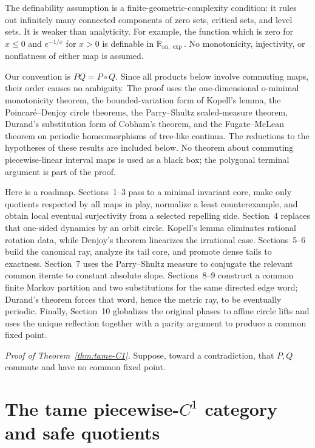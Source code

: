 \documentclass[11pt]{article}
\theoremstyle{definition}
\theoremstyle{remark}
\begin{document}
The definability assumption is a finite-geometric-complexity condition: it
rules out infinitely many connected components of zero sets, critical sets,
and level sets.  It is weaker than analyticity.  For example, the function
which is zero for $x\leq0$ and $e^{-1/x}$ for $x>0$ is definable in
$\mathbb R_{\mathrm{an},\exp}$.  No monotonicity, injectivity, or
nonflatness of either map is assumed.

Our convention is \(PQ=P\circ Q\).  Since all products below involve
commuting maps, their order causes no ambiguity.  The proof uses the
one-dimensional o-minimal monotonicity theorem, the bounded-variation form of
Kopell's lemma, the Poincar\'e--Denjoy circle theorems, the
Parry--Shultz scaled-measure theorem, Durand's substitution form of Cobham's
theorem, and the Fugate--McLean theorem on periodic homeomorphisms of
tree-like continua.  The reductions to the hypotheses of these results are
included below.  No theorem about commuting piecewise-linear interval maps is
used as a black box; the polygonal terminal argument is part of the proof.

Here is a roadmap.  Sections~1--3 pass to a minimal invariant core, make only
quotients respected by all maps in play, normalize a least counterexample,
and obtain local eventual surjectivity from a selected repelling side.
Section~4 replaces that one-sided dynamics by an orbit circle.  Kopell's
lemma eliminates rational rotation data, while Denjoy's theorem linearizes
the irrational case.  Sections~5--6 build the canonical ray, analyze its
tail core, and promote dense tails to exactness.  Section~7 uses the
Parry--Shultz measure to conjugate the relevant common iterate to constant
absolute slope.  Sections~8--9 construct a common finite Markov partition
and two substitutions for the same directed edge word; Durand's theorem
forces that word, hence the metric ray, to be eventually periodic.  Finally,
Section~10 globalizes the original phases to affine circle lifts and uses the
unique reflection together with a parity argument to produce a common fixed
point.

\par\noindent\textit{Proof of Theorem~\ref{thm:tame-C1}.}\quad
Suppose, toward a contradiction, that \(P,Q\) commute and have no common
fixed point.

\section{The tame piecewise-\texorpdfstring{\(C^1\)}{C1} category and safe quotients}
\end{document}
